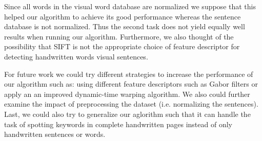 \documentclass[conference]{IEEEtran}
\begin{document}
Since all words in the visual word database are normalized we suppose that this helped our algorithm to achieve its good performance whereas the sentence database is not normalized. Thus the second task does not yield equally well results when running our algorithm. Furthermore, we also thought of the possibility that SIFT is not the appropriate choice of feature descriptor for detecting handwritten words visual sentences. 

For future work we could try different strategies to increase the performance of our algorithm such as: using different feature descriptors such as Gabor filters or apply an an improved dynamic-time warping algorithm. 
We also could further examine the impact of preprocessing the dataset (i.e. normalizing the sentences). 
Last, we could also try to generalize our aglorithm such that it can handle the task of spotting keywords in complete handwritten pages instead of only handwritten sentences or words. 


%
%



%
%
\end{document}
